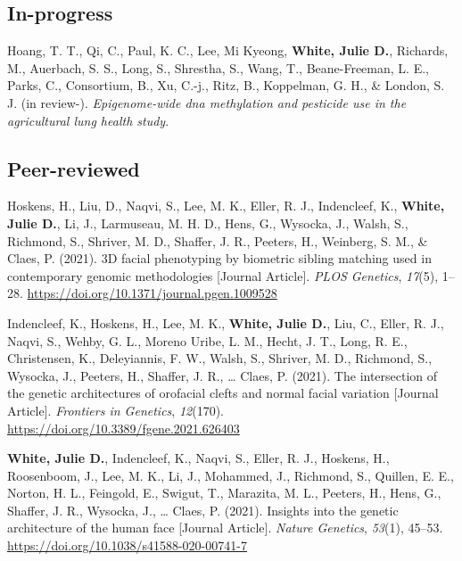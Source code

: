 \documentclass[11pt, a4paper]{awesome-cv}
\begin{document}
\hypertarget{in-progress}{%
\subsection{In-progress}\label{in-progress}}

\begingroup
\setlength{\parindent}{-0.5in}
\setlength{\leftskip}{0.5in}

\hypertarget{refs_inprogress}{}
\leavevmode\hypertarget{ref-Thanh_PesticideEWAS}{}%
Hoang, T. T., Qi, C., Paul, K. C., Lee, Mi Kyeong, \textbf{White, Julie
D.}, Richards, M., Auerbach, S. S., Long, S., Shrestha, S., Wang, T.,
Beane-Freeman, L. E., Parks, C., Consortium, B., Xu, C.-j., Ritz, B.,
Koppelman, G. H., \& London, S. J. (in review-). \emph{Epigenome-wide
dna methylation and pesticide use in the agricultural lung health
study}.

\endgroup

\hypertarget{peer-reviewed}{%
\subsection{Peer-reviewed}\label{peer-reviewed}}

\begingroup
\setlength{\parindent}{-0.5in}
\setlength{\leftskip}{0.5in}

\hypertarget{refs_published}{}
\leavevmode\hypertarget{ref-Hoskens_2021_BiometricMatching}{}%
Hoskens, H., Liu, D., Naqvi, S., Lee, M. K., Eller, R. J., Indencleef,
K., \textbf{White, Julie D.}, Li, J., Larmuseau, M. H. D., Hens, G.,
Wysocka, J., Walsh, S., Richmond, S., Shriver, M. D., Shaffer, J. R.,
Peeters, H., Weinberg, S. M., \& Claes, P. (2021). 3D facial phenotyping
by biometric sibling matching used in contemporary genomic methodologies
{[}Journal Article{]}. \emph{PLOS Genetics}, \emph{17}(5), 1--28.
\url{https://doi.org/10.1371/journal.pgen.1009528}

\leavevmode\hypertarget{ref-Indencleef_2021_NSCLP}{}%
Indencleef, K., Hoskens, H., Lee, M. K., \textbf{White, Julie D.}, Liu,
C., Eller, R. J., Naqvi, S., Wehby, G. L., Moreno Uribe, L. M., Hecht,
J. T., Long, R. E., Christensen, K., Deleyiannis, F. W., Walsh, S.,
Shriver, M. D., Richmond, S., Wysocka, J., Peeters, H., Shaffer, J. R.,
\ldots{} Claes, P. (2021). The intersection of the genetic architectures
of orofacial clefts and normal facial variation {[}Journal Article{]}.
\emph{Frontiers in Genetics}, \emph{12}(170).
\url{https://doi.org/10.3389/fgene.2021.626403}

\leavevmode\hypertarget{ref-White_Indencleef_2021_MetaGWAS}{}%
\textbf{White, Julie D.}, Indencleef, K., Naqvi, S., Eller, R. J.,
Hoskens, H., Roosenboom, J., Lee, M. K., Li, J., Mohammed, J., Richmond,
S., Quillen, E. E., Norton, H. L., Feingold, E., Swigut, T., Marazita,
M. L., Peeters, H., Hens, G., Shaffer, J. R., Wysocka, J., \ldots{}
Claes, P. (2021). Insights into the genetic architecture of the human
face {[}Journal Article{]}. \emph{Nature Genetics}, \emph{53}(1),
45--53. \url{https://doi.org/10.1038/s41588-020-00741-7}
\end{document}
